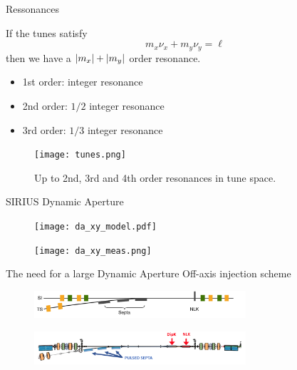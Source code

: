 \documentclass[aspectratio=169]{beamer}
\begin{document}
\begin{frame}{Ressonances}
    \begin{minipage}{0.48\textwidth}
           If the tunes satisfy
           $$m_x\nu_x+m_y\nu_y=\ell$$
           then we have a $\abs{m_x}+\abs{m_y}$ order resonance.
    \end{minipage}{}
    \hfill
    \begin{minipage}{0.48\textwidth}
        \begin{itemize}
               \item 1st order: integer resonance
               \item 2nd order: $1/2$ integer resonance
               \item 3rd order: $1/3$ integer resonance
           \end{itemize}{}
    \end{minipage}{}

    \begin{figure}
        \centering
        \texttt{[image: tunes.png]}
        \caption*{Up to 2nd, 3rd and 4th order resonances in tune space.}
    \end{figure}{}
\end{frame}{}
\begin{frame}{SIRIUS Dynamic Aperture}
    \begin{minipage}{0.49\textwidth}
        \begin{figure}
            \centering
            \texttt{[image: da\_xy\_model.pdf]}
        \end{figure}
    \end{minipage}
    \begin{minipage}{0.49\textwidth}
        \begin{figure}
            \centering
            \texttt{[image: da\_xy\_meas.png]}
        \end{figure}
    \end{minipage}
\end{frame}
\begin{frame}{The need for a large Dynamic Aperture}
    Off-axis injection scheme
    \begin{figure}
        \centering
        \includegraphics[width=0.7\textwidth]{injection.pdf}
    \end{figure}
    \begin{figure}
        \centering
        \includegraphics[width=0.7\textwidth]{off_axis_injection.png}
    \end{figure}
\end{frame}
\end{document}
